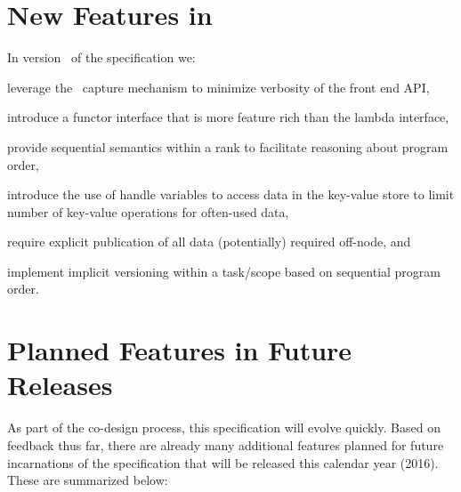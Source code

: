 \section{New Features in \specVersion}
\label{sec:current}
In version \specVersion\ of the specification we:
  \begin{compactenum}
\item leverage the \CC\ \gls{capture} mechanism to minimize verbosity of the \gls{front end}
    \gls{API},
\item introduce a functor interface that is more feature rich than the lambda interface,
\item provide \gls{sequential semantics} within a \gls{rank} to
    facilitate reasoning about program order,
\item introduce the use of
    \gls{handle} variables to access data in the \gls{key-value store} to limit number of key-value operations for often-used data,
\item require explicit publication of all data (potentially) required off-node, and
\item implement implicit versioning within a task/scope based on sequential program order.
    \end{compactenum}


\section{Planned Features in Future Releases}
\label{sec:future}

As part of the \gls{co-design} process, this specification will evolve quickly.
  Based on feedback thus far, there are already
many additional features planned for future incarnations of the specification that
will be released this calendar year (2016).  These are summarized below:

